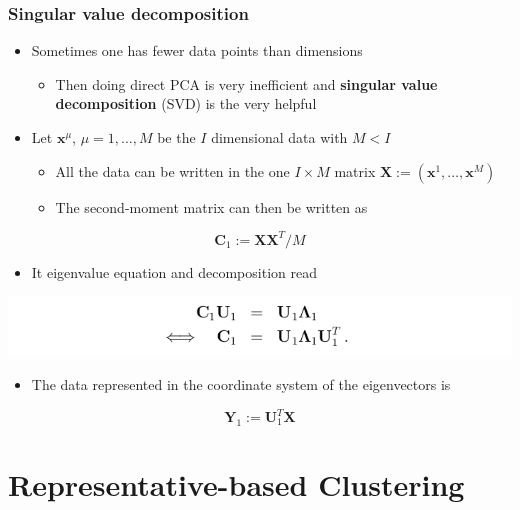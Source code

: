 \documentclass[11pt]{article}
\begin{document}
\subsubsection{Singular value decomposition}
\label{sec:org720d56f}
\begin{itemize}
\item Sometimes one has fewer data points than dimensions
\begin{itemize}
\item Then doing direct PCA is very inefficient and \textbf{singular value decomposition} (SVD) is the very helpful
\end{itemize}

\item Let \(\pmb x^\mu\), \(\mu=1,\dots, M\) be the \(I\) dimensional data with \(M < I\)
\begin{itemize}
\item All the data can be written in the one \(I \times M\) matrix \(\pmb X := (\pmb x^1, \dots, \pmb x^M)\)
\item The second-moment matrix can then be written as
\end{itemize}
\end{itemize}
\begin{equation}
  \pmb C_1 := \pmb X \pmb X^T /M
\end{equation}
\begin{itemize}
\item It eigenvalue equation and decomposition read
\end{itemize}
\begin{center}
\includegraphics[width=.9\linewidth]{Principal Component Analysis/screenshot_2018-11-20_22-56-59.png}
\end{center}
\begin{itemize}
\item The data represented in the coordinate system of the eigenvectors is
\end{itemize}
\begin{equation}
  \pmb Y_1 := \pmb U_1^T \pmb X 
\end{equation}

\section{Representative-based Clustering}
\label{sec:org0aa90e7}
\end{document}
